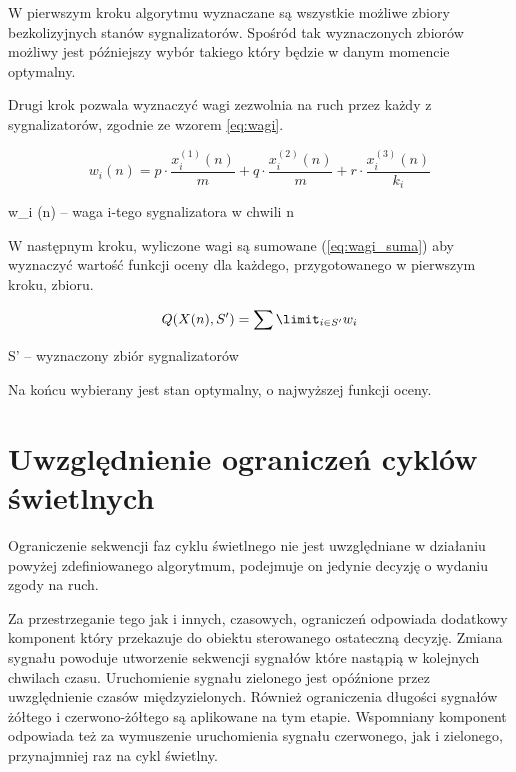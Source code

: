 \vspace{0.5cm}
W pierwszym kroku algorytmu wyznaczane są wszystkie możliwe zbiory bezkolizyjnych stanów sygnalizatorów.
Spośród tak wyznaczonych zbiorów możliwy jest późniejszy wybór takiego który będzie w danym momencie optymalny.

\vspace{0.5cm}
Drugi krok pozwala wyznaczyć wagi zezwolnia na ruch przez każdy z sygnalizatorów, zgodnie ze wzorem \ref{eq:wagi}.

\begin{equation}
\label{eq:wagi}
	w_{i} (n) = p \cdot \frac{x^{(1)}_{i} (n)}{m} + q \cdot \frac{x^{(2)}_{i} (n)}{m} + r \cdot \frac{x^{(3)}_{i} (n)}{k_{i}}
\end{equation}

w_{i} (n) \textrm{ -- waga i-tego sygnalizatora w chwili n}

\vspace{0.5cm}
W następnym kroku, wyliczone wagi są sumowane (\ref{eq:wagi_suma}) aby wyznaczyć wartość funkcji oceny dla każdego, przygotowanego w pierwszym kroku, zbioru.

\begin{equation}
\label{eq:wagi_suma}
	Q (X(n), S') = \sum\limit_{i \in S'} w_{i}
\end{equation}

S' \textrm{ -- wyznaczony zbiór sygnalizatorów}

\vspace{0.5cm}
Na końcu wybierany jest stan optymalny, o najwyższej funkcji oceny.

\section{Uwzględnienie ograniczeń cyklów świetlnych}
Ograniczenie sekwencji faz cyklu świetlnego nie jest uwzględniane w działaniu powyżej zdefiniowanego algorytmum, podejmuje on jedynie decyzję o wydaniu zgody na ruch.

Za przestrzeganie tego jak i innych, czasowych, ograniczeń odpowiada dodatkowy komponent który przekazuje do obiektu sterowanego ostateczną decyzję. Zmiana sygnału powoduje utworzenie sekwencji sygnałów które nastąpią w kolejnych chwilach czasu. Uruchomienie sygnału zielonego jest opóźnione przez uwzględnienie czasów międzyzielonych. Również ograniczenia długości sygnałów żółtego i czerwono-żółtego są aplikowane na tym etapie. Wspomniany komponent odpowiada też za wymuszenie uruchomienia sygnału czerwonego, jak i zielonego, przynajmniej raz na cykl świetlny.

